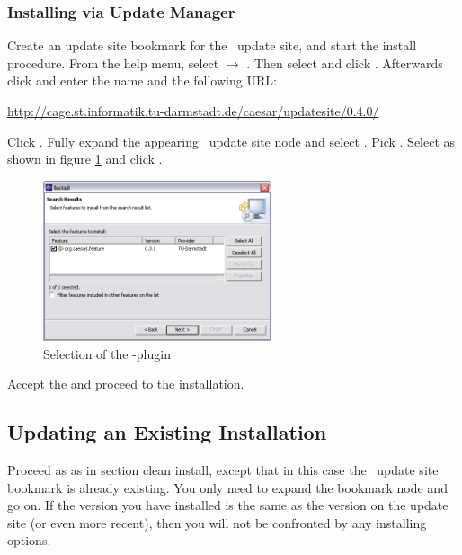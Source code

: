 \subsubsection{Installing via Update Manager} 
Create an update site bookmark for the \cjdt ~update site, and start the install procedure.
From the help menu, select  $\rightarrow$ . Then select  and click .
Afterwards click  and enter the name  and the following URL:  
\begin{center}
\href{http://cage.st.informatik.tu-darmstadt.de/caesar/updatesite/0.4.0/}{http://cage.st.informatik.tu-darmstadt.de/caesar/updatesite/0.4.0/}
\end{center}
Click .
Fully expand the appearing \cjdt ~update site node and select \markedtext{\caesarj}. Pick
. Select  as shown in figure \ref{fig:installpage30} and click .\\

\begin{figure}[htbp]
	\centering
		\includegraphics[width=0.60\textwidth]{./images/install_page_3_0.png}
	\caption{Selection of the \caesarj -plugin}
	\label{fig:installpage30}
\end{figure}

Accept the  and proceed to the installation.

\subsection{Updating an Existing Installation}
Proceed as as in section clean install, except that in this case the \cjdt ~update site bookmark is already
existing. You only need to expand the bookmark node and go on. If the version you have
installed is the same as the version on the update site (or even more recent),
then you will not be confronted by any installing options.

